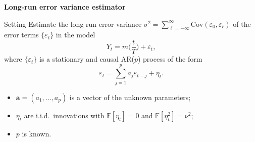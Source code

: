 \documentclass[10pt]{beamer}
\newcommand{\E}{\mathbb{E}}
\newcommand{\Cov}{\mathrm{Cov}}
\begin{document}
\begin{frame}
\thispagestyle{empty}
\begin{center}
\Large{\textbf{Long-run error variance estimator}}
\end{center}
\end{frame}

\begin{frame}{Setting}
Estimate the long-run error variance $\sigma^2 = \sum\nolimits_{\ell=-\infty}^{\infty} \Cov(\varepsilon_0,\varepsilon_{\ell})$ of the error terms $\{\varepsilon_t\}$ in the model 
\begin{equation*}
Y_t = m \Big( \frac{t}{T} \Big) + \varepsilon_t, 
\end{equation*}
where $\{\varepsilon_t\}$ is a stationary and causal AR($p$) process of the form 
\begin{equation*}
\varepsilon_t = \sum_{j=1}^p a_j \varepsilon_{t-j} + \eta_t. 
\end{equation*} \pause
\begin{itemize}
	\item $\boldsymbol{a} = (a_1,\ldots,a_p)$ is a vector of the unknown parameters;\pause
	\item $\eta_t$ are i.i.d.\ innovations with $\E[\eta_t] = 0$ and $\E[\eta_t^2] = \nu^2$;\pause
	\item $p$ is known.
\end{itemize}
\end{frame}
\end{document}
